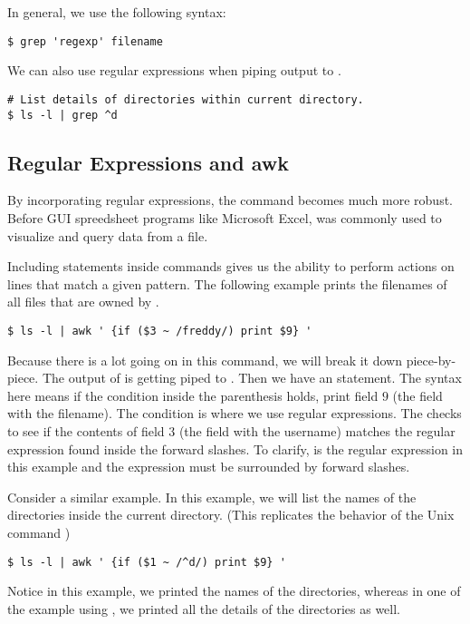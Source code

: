 In general, we use the following syntax:
\begin{lstlisting}
$ grep 'regexp' filename
\end{lstlisting}

We can also use regular expressions when piping output to .
\begin{lstlisting}
# List details of directories within current directory.
$ ls -l | grep ^d
\end{lstlisting}

\subsection*{Regular Expressions and awk}
By incorporating regular expressions, the  command becomes much more robust.
Before GUI spreedsheet programs like Microsoft Excel,  was commonly used to visualize and query data from a file.

Including  statements inside  commands gives us the ability to perform actions on lines that match a given pattern.
The following example prints the filenames of all files that are owned by .
\begin{lstlisting}
$ ls -l | awk ' {if ($3 ~ /freddy/) print $9} '
\end{lstlisting}

Because there is a lot going on in this command, we will break it down piece-by-piece.
The output of  is getting piped to . Then we have an  statement.
The syntax here means if the condition inside the parenthesis holds, print field $9$ (the field with the filename). The condition is where we use regular expressions.
The \li{\~} checks to see if the contents of field $3$ (the field with the username) matches the regular expression found inside the forward slashes.
To clarify,  is the regular expression in this example and the expression must be surrounded by forward slashes.

Consider a similar example.
In this example, we will list the names of the directories inside the current directory.
(This replicates the behavior of the Unix command )

\begin{lstlisting}
$ ls -l | awk ' {if ($1 ~ /^d/) print $9} '
\end{lstlisting}

Notice in this example, we printed the names of the directories, whereas in one of the example using , we printed all the details of the directories as well.

